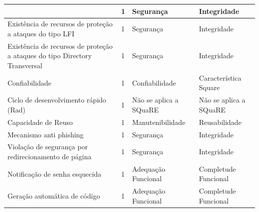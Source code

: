 \begin{apendicesenv}
\begin{longtable}{|p{175pt}|p{18pt}|p{110pt}|p{120pt}|}
  	 	 & {\raggedright {1}}
  	 	   	 	 & {\raggedright {Segurança}}
  	 	   	 	 & {\raggedright {Integridade}}\\
  	 	\hline
{\raggedright {Existência de recursos de proteção a ataques do tipo LFI
}}
  	 	& {\raggedright {1}}
  	 	  	 	 & {\raggedright {Segurança}}
  	 	  	 	 & {\raggedright {Integridade}}\\
  	 	\hline  
{\raggedright {Existência de recursos de proteção a ataques do tipo Directory Transversal}}
  	 	 & {\raggedright {1}}
  	 	 & {\raggedright {Segurança}}
  	 	 & {\raggedright {Integridade}}\\
  	 	\hline
{\raggedright {Confiabilidade}}
  	 	 & {\raggedright {1}}
  	 	 & {\raggedright {Confiabilidade}}
  	 	 & {\raggedright {Característica Square}}\\
  	 	\hline  
{\raggedright {Ciclo de desenvolvimento rápido (Rad)
}}
  	 	 & {\raggedright {1}}
  	 	 & {\raggedright {Não se aplica a SQuaRE}}
  	 	 & {\raggedright {Não se aplica a SQuaRE}}\\
  	 	\hline
{\raggedright {Capacidade de Reuso
}}
  	 	 & {\raggedright {1}}
  	 	 & {\raggedright {Manutenibilidade}}
  	 	 & {\raggedright {Reusabilidade}}\\
  	 	\hline
  	 	{\raggedright {Mecanismo anti phishing
  	 	}}
  	 	  	 	 & {\raggedright {1}}
  	 	  	 	 & {\raggedright {Segurança}}
  	 	  	 	 & {\raggedright {Integridade}}\\
  	 	  	 	\hline
  	 	{\raggedright {Violação de segurança por redirecionamento de página}}
  	 	  	 	 & {\raggedright {1}}
  	 	  	 	 & {\raggedright {Segurança}}
  	 	  	 	 & {\raggedright {Integridade}}\\
  	 	  	 	\hline  
{\raggedright {Notificação de senha esquecida}}
  	 	 & {\raggedright {1}}
  	 	 & {\raggedright {Adequação Funcional}}
  	 	 & {\raggedright {Completude Funcional}}\\
  	 	\hline
{\raggedright {Geração automática de código}}
  	 	 & {\raggedright {1}}
  	 	 & {\raggedright {Adequação Funcional}}
  	 	 & {\raggedright {Completude Funcional}}\\

\end{longtable}
\end{apendicesenv}
